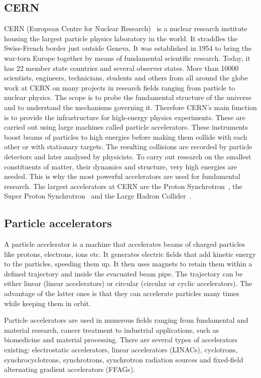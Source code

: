 \documentclass[twoside,12pt]{packages/mytustyle}  %
\begin{document}
\subsection{CERN}
CERN (European Centre for Nuclear Research)~\cite{CERN:00000} is a nuclear research institute housing the largest particle physics laboratory in the world. It straddles the Swiss-French border just outside Geneva. It was established in 1954 to bring the war-torn Europe together by means of fundamental scientific research. Today, it has 22 member state countries and several observer states. More than 10000 scientists, engineers, technicians, students and others from all around the globe work at CERN on many projects in research fields ranging from particle to nuclear physics. The scope is to probe the fundamental structure of the universe and to understand the mechanisms governing it. Therefore CERN's main function is to provide the infrastructure for high-energy physics experiments. These are carried out using large machines called particle accelerators. These instruments boost beams of particles to high energies before making them collide with each other or with stationary targets. The resulting collisions are recorded by particle detectors and later analysed by physicists. To carry out research on the smallest constituents of matter, their dynamics and structure, very high energies are needed. This is why the most powerful accelerators are used for fundamental research. The largest accelerators at CERN are the Proton Synchrotron~\cite{}, the Super Proton Synchrotron~\cite{Mills:133232} and the Large Hadron Collider~\cite{}.

\subsection{Particle accelerators}
A particle accelerator is a machine that accelerates beams of charged particles like protons, electrons, ions etc. It generates electric fields that add kinetic energy to the particles, speeding them up. It then uses magnets to retain them within a defined trajectory and inside the evacuated beam pipe. The trajectory can be either linear (linear accelerators) or circular (circular or cyclic accelerators). The advantage of the latter ones is that they can accelerate particles many times while keeping them in orbit.

Particle accelerators are used in numerous fields ranging from fundamental and material research, cancer treatment to industrial applications, such as biomedicine and material processing. There are several types of accelerators existing: electrostatic accelerators, linear accelerators (LINACs), cyclotrons, synchrocyclotrons, synchrotrons, synchrotron radiation sources and fixed-field alternating gradient accelerators (FFAGs).
\end{document}
